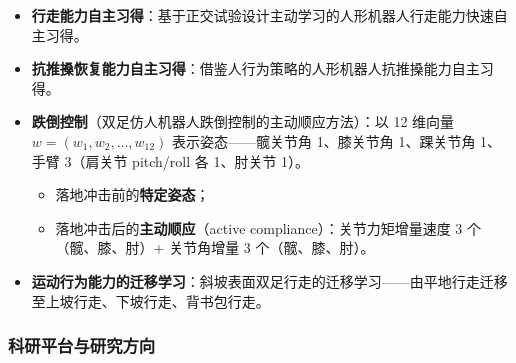 \begin{itemize}[itemsep=2pt]
    \item \textbf{行走能力自主习得}：基于正交试验设计主动学习的人形机器人行走能力快速自主习得。
    \item \textbf{抗推搡恢复能力自主习得}：借鉴人行为策略的人形机器人抗推搡能力自主习得。
    \item \textbf{跌倒控制}（双足仿人机器人跌倒控制的主动顺应方法）：以 12 维向量 $w = (w_1, w_2, \ldots, w_{12})$ 表示姿态——髋关节角 1、膝关节角 1、踝关节角 1、手臂 3（肩关节 pitch/roll 各 1、肘关节 1）。
    \begin{itemize}
        \item 落地冲击前的\textbf{特定姿态}；
        \item 落地冲击后的\textbf{主动顺应}（active compliance）：关节力矩增量速度 3 个（髋、膝、肘）+ 关节角增量 3 个（髋、膝、肘）。
    \end{itemize}
    \item \textbf{运动行为能力的迁移学习}：斜坡表面双足行走的迁移学习——由平地行走迁移至上坡行走、下坡行走、背书包行走。
\end{itemize}

\subsubsection{科研平台与研究方向}


